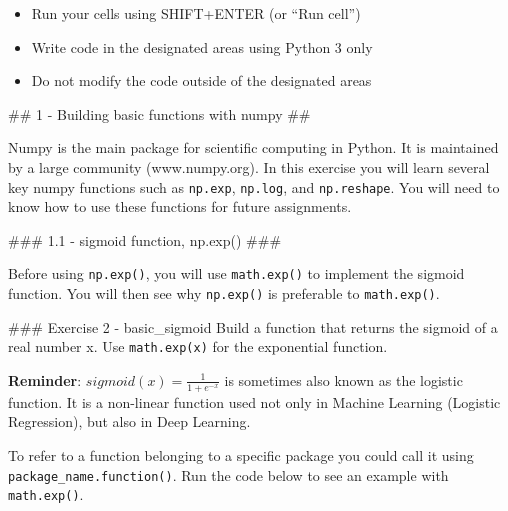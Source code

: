 \documentclass[11pt]{article}
\providecommand{\tightlist}{%
      \setlength{\itemsep}{0pt}\setlength{\parskip}{0pt}}
\begin{document}
\begin{itemize}
\tightlist
\item
  Run your cells using SHIFT+ENTER (or ``Run cell'')
\item
  Write code in the designated areas using Python 3 only
\item
  Do not modify the code outside of the designated areas
\end{itemize}

    \#\# 1 - Building basic functions with numpy \#\#

Numpy is the main package for scientific computing in Python. It is
maintained by a large community (www.numpy.org). In this exercise you
will learn several key numpy functions such as \texttt{np.exp},
\texttt{np.log}, and \texttt{np.reshape}. You will need to know how to
use these functions for future assignments.

\#\#\# 1.1 - sigmoid function, np.exp() \#\#\#

Before using \texttt{np.exp()}, you will use \texttt{math.exp()} to
implement the sigmoid function. You will then see why \texttt{np.exp()}
is preferable to \texttt{math.exp()}.

\#\#\# Exercise 2 - basic\_sigmoid Build a function that returns the
sigmoid of a real number x. Use \texttt{math.exp(x)} for the exponential
function.

\textbf{Reminder}: \(sigmoid(x) = \frac{1}{1+e^{-x}}\) is sometimes also
known as the logistic function. It is a non-linear function used not
only in Machine Learning (Logistic Regression), but also in Deep
Learning.

To refer to a function belonging to a specific package you could call it
using \texttt{package\_name.function()}. Run the code below to see an
example with \texttt{math.exp()}.
\end{document}
